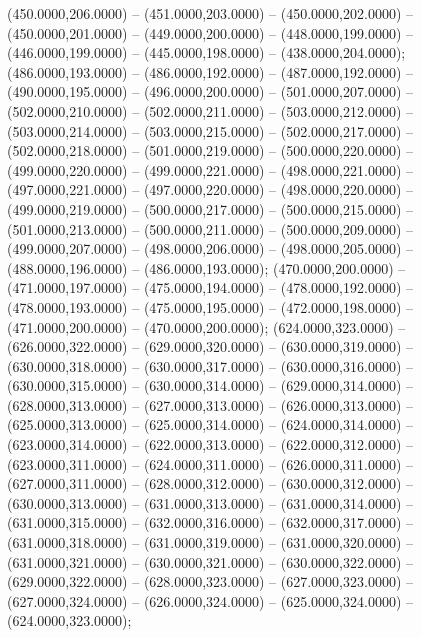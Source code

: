 \begin{scope}[draw=black,fill=cd7191c,line join=round,line width=0.208pt]
    (450.0000,206.0000) -- (451.0000,203.0000) -- (450.0000,202.0000) --
    (450.0000,201.0000) -- (449.0000,200.0000) -- (448.0000,199.0000) --
    (446.0000,199.0000) -- (445.0000,198.0000) -- (438.0000,204.0000);
   (486.0000,193.0000) -- (486.0000,192.0000) --
    (487.0000,192.0000) -- (490.0000,195.0000) -- (496.0000,200.0000) --
    (501.0000,207.0000) -- (502.0000,210.0000) -- (502.0000,211.0000) --
    (503.0000,212.0000) -- (503.0000,214.0000) -- (503.0000,215.0000) --
    (502.0000,217.0000) -- (502.0000,218.0000) -- (501.0000,219.0000) --
    (500.0000,220.0000) -- (499.0000,220.0000) -- (499.0000,221.0000) --
    (498.0000,221.0000) -- (497.0000,221.0000) -- (497.0000,220.0000) --
    (498.0000,220.0000) -- (499.0000,219.0000) -- (500.0000,217.0000) --
    (500.0000,215.0000) -- (501.0000,213.0000) -- (500.0000,211.0000) --
    (500.0000,209.0000) -- (499.0000,207.0000) -- (498.0000,206.0000) --
    (498.0000,205.0000) -- (488.0000,196.0000) -- (486.0000,193.0000);
   (470.0000,200.0000) -- (471.0000,197.0000) --
    (475.0000,194.0000) -- (478.0000,192.0000) -- (478.0000,193.0000) --
    (475.0000,195.0000) -- (472.0000,198.0000) -- (471.0000,200.0000) --
    (470.0000,200.0000);
   (624.0000,323.0000) -- (626.0000,322.0000) --
    (629.0000,320.0000) -- (630.0000,319.0000) -- (630.0000,318.0000) --
    (630.0000,317.0000) -- (630.0000,316.0000) -- (630.0000,315.0000) --
    (630.0000,314.0000) -- (629.0000,314.0000) -- (628.0000,313.0000) --
    (627.0000,313.0000) -- (626.0000,313.0000) -- (625.0000,313.0000) --
    (625.0000,314.0000) -- (624.0000,314.0000) -- (623.0000,314.0000) --
    (622.0000,313.0000) -- (622.0000,312.0000) -- (623.0000,311.0000) --
    (624.0000,311.0000) -- (626.0000,311.0000) -- (627.0000,311.0000) --
    (628.0000,312.0000) -- (630.0000,312.0000) -- (630.0000,313.0000) --
    (631.0000,313.0000) -- (631.0000,314.0000) -- (631.0000,315.0000) --
    (632.0000,316.0000) -- (632.0000,317.0000) -- (631.0000,318.0000) --
    (631.0000,319.0000) -- (631.0000,320.0000) -- (631.0000,321.0000) --
    (630.0000,321.0000) -- (630.0000,322.0000) -- (629.0000,322.0000) --
    (628.0000,323.0000) -- (627.0000,323.0000) -- (627.0000,324.0000) --
    (626.0000,324.0000) -- (625.0000,324.0000) -- (624.0000,323.0000);
\end{scope}

